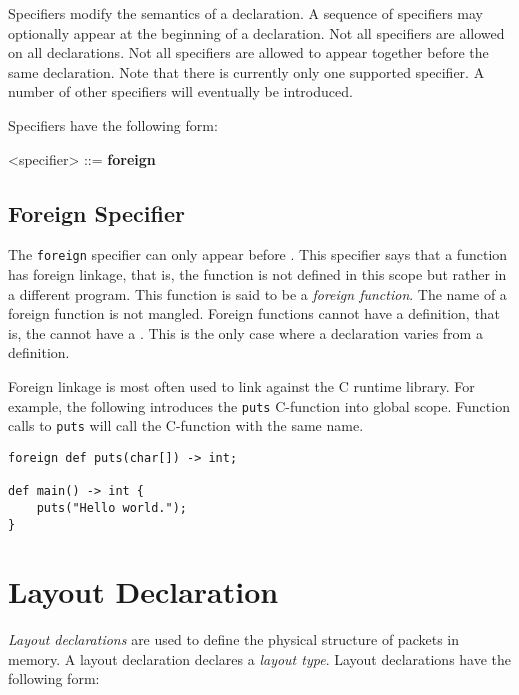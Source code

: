 Specifiers modify the semantics of a declaration. A sequence of specifiers may optionally appear at the beginning of a declaration. Not all specifiers are allowed on all declarations. Not all specifiers are allowed to appear together before the same declaration. Note that there is currently only one supported specifier. A number of other specifiers will eventually be introduced.

Specifiers have the following form:

\begin{grammar}
\singlespace
<specifier> ::= \textbf{foreign}
\end{grammar}

\subsection{Foreign Specifier} \label{guide:foreign_spec}

The \texttt{foreign} specifier can only appear before . This specifier says that a function has foreign linkage, that is, the function is not defined in this scope but rather in a different program. This function is said to be a \textit{foreign function}. The name of a foreign function is not mangled. Foreign functions cannot have a definition, that is, the  cannot have a . This is the only case where a declaration varies from a definition.

Foreign linkage is most often used to link against the C runtime library. For example, the following introduces the \texttt{puts} C-function into global scope. Function calls to \texttt{puts} will call the C-function with the same name.

\begin{minip}
\begin{lstlisting}
foreign def puts(char[]) -> int;

def main() -> int {
	puts("Hello world.");
}
\end{lstlisting}
\end{minip}
 
\section{Layout Declaration} \label{guide:layout}

\textit{Layout declarations} are used to define the physical structure of packets in memory. A layout declaration declares a \textit{layout type}. Layout declarations have the following form:

